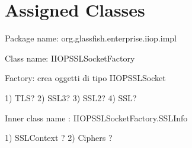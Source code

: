 \section{Assigned Classes}






Package name: org.glassfish.enterprise.iiop.impl

Class name: IIOPSSLSocketFactory

Factory: crea oggetti di tipo IIOPSSLSocket

1) TLS?
2) SSL3?
3) SSL2?
4) SSL?

Inner class name : IIOPSSLSocketFactory.SSLInfo

1) SSLContext ?
2) Ciphers ?
